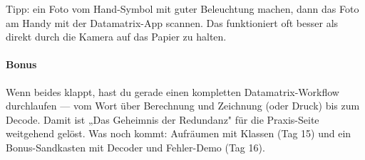 Tipp: ein Foto vom Hand-Symbol mit guter Beleuchtung machen, dann
das Foto am Handy mit der Datamatrix-App scannen. Das funktioniert
oft besser als direkt durch die Kamera auf das Papier zu halten.

\paragraph{Bonus} Wenn beides klappt, hast du gerade einen
kompletten Datamatrix-Workflow durchlaufen — vom Wort über
Berechnung und Zeichnung (oder Druck) bis zum Decode. Damit ist
„Das Geheimnis der Redundanz" für die Praxis-Seite weitgehend
gelöst. Was noch kommt: Aufräumen mit Klassen (Tag 15) und ein
Bonus-Sandkasten mit Decoder und Fehler-Demo (Tag 16).
